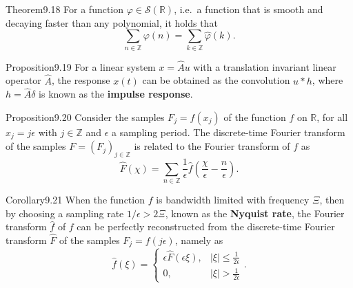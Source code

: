 \begin{res}{Theorem}{9.18}
For a function $\varphi\in\mathcal S(\mathbb R)$, i.e.\ a function that is smooth and decaying faster than any polynomial, it holds that
\begin{equation}\sum_{n\in\mathbb Z}\varphi(n)=\sum_{k\in\mathbb Z}\widehat\varphi(k).\tag{9.110}\end{equation}
\end{res}

\begin{res}{Proposition}{9.19}
For a linear system $x=\hat Au$ with a translation invariant linear operator $\hat A$, the response $x(t)$ can be obtained as the convolution $u*h$, where $h=\hat A\delta$ is known as the \textbf{impulse response}.
\end{res}

\begin{res}{Proposition}{9.20}
Consider the samples $F_j=f(x_j)$ of the function $f$ on $\mathbb R$, for all $x_j=j\epsilon$ with $j\in\mathbb Z$ and $\epsilon$ a sampling period. The discrete-time Fourier transform of the samples $F=(F_j)_{j\in\mathbb Z}$ is related to the Fourier transform of $f$ as
\begin{equation}\widehat F(\chi)=\sum_{n\in\mathbb Z}\frac1\epsilon\widehat f\left(\frac\chi\epsilon-\frac n\epsilon\right).\tag{9.125}\end{equation}
\end{res}

\begin{res}{Corollary}{9.21}
When the function $f$ is bandwidth limited with frequency $\Xi$, then by choosing a sampling rate $1/\epsilon>2\Xi$, known as the \textbf{Nyquist rate}, the Fourier transform $\widehat f$ of $f$ can be perfectly reconstructed from the discrete-time Fourier transform $\widehat F$ of the samples $F_j=f(j\epsilon)$, namely as
\begin{equation}\widehat f(\xi)=\begin{cases}\epsilon\widehat F(\epsilon\xi),&|\xi|\le\frac1{2\epsilon}\\0,&|\xi|>\frac1{2\epsilon}\end{cases}.\tag{9.126}\end{equation}
\end{res}

